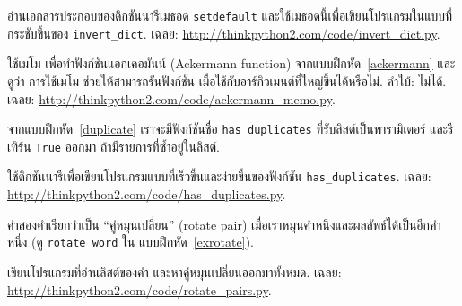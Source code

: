 \begin{exercise}
\label{setdefault}

อ่านเอกสารประกอบของดิกชันนารีเมธอด \texttt{setdefault}
และใช้เมธอดนี้เพื่อเขียนโปรแกรมในแบบที่กระชับขึ้นของ \verb|invert_dict|.
เฉลย: \url{http://thinkpython2.com/code/invert_dict.py}.

\end{exercise}
\vspace{0.5cm}


\begin{exercise}
ใช้เมโม เพื่อทำฟังก์ชันแอกเคอมันน์ (Ackermann function) จากแบบฝึกหัด~\ref{ackermann} 
และดูว่า การใช้เมโม ช่วยให้สามารถรันฟังก์ชัน เมื่อใช้กับอาร์กิวเมนต์ที่ใหญ่ขึ้นได้หรือไม่.  
คำใบ้: ไม่ได้.
เฉลย: \url{http://thinkpython2.com/code/ackermann_memo.py}.

\end{exercise}
\vspace{0.5cm}



\begin{exercise}

จากแบบฝึกหัด~\ref{duplicate} เราจะมีฟังก์ชันชื่อ \verb|has_duplicates| ที่รับลิสต์เป็นพารามิเตอร์ และรีเทิร์น \texttt{True} ออกมา ถ้ามีรายการที่ซ้ำอยู่ในลิสต์.

ใช้ดิกชันนารีเพื่อเขียนโปรแกรมแบบที่เร็วขึ้นและง่ายขึ้นของฟังก์ชัน
\verb|has_duplicates|. 
เฉลย: \url{http://thinkpython2.com/code/has_duplicates.py}.

\end{exercise}
\vspace{0.5cm}


\begin{exercise}
\label{exrotatepairs}

คำสองคำเรียกว่าเป็น ``คู่หมุนเปลี่ยน'' (rotate pair) 
เมื่อเราหมุนคำหนึ่งและผลลัพธ์ได้เป็นอีกคำหนึ่ง (ดู \verb|rotate_word| ใน แบบฝึกหัด~\ref{exrotate}).

เขียนโปรแกรมที่อ่านลิสต์ของคำ และหาคู่หมุนเปลี่ยนออกมาทั้งหมด.
เฉลย: \url{http://thinkpython2.com/code/rotate_pairs.py}.

\end{exercise}
\vspace{0.5cm}



